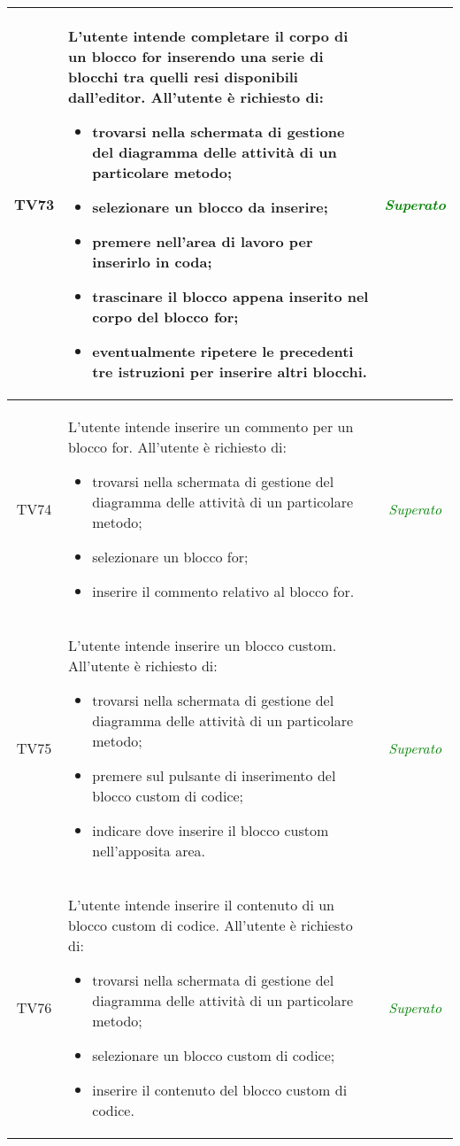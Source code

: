 \begin{longtable}{|c|>{}m{8cm}|c|}
\hypertarget{TV4.5.4}{TV73} & L'utente intende completare il corpo di un blocco for inserendo una serie di blocchi tra quelli resi disponibili dall'editor.
All'utente è richiesto di:
\begin{itemize}
	\item trovarsi nella schermata di gestione del diagramma delle attività di un particolare metodo;
	\item selezionare un blocco da inserire;
	\item premere nell'area di lavoro per inserirlo in coda;
	\item trascinare il blocco appena inserito nel corpo del blocco for;
	\item eventualmente ripetere le precedenti tre istruzioni per inserire altri blocchi.
\end{itemize} & \textcolor{Green}{\textit{Superato}}\\ \hline

\hypertarget{TV4.5.5}{TV74} & L'utente intende inserire un commento per un blocco for.
All'utente è richiesto di:
\begin{itemize}
	\item trovarsi nella schermata di gestione del diagramma delle attività di un particolare metodo;
	\item selezionare un blocco for;
	\item inserire il commento relativo al blocco for.
\end{itemize} & \textcolor{Green}{\textit{Superato}}\\ \hline

\hypertarget{TV4.6}{TV75} & L'utente intende inserire un blocco custom.
All'utente è richiesto di:
\begin{itemize}
	\item trovarsi nella schermata di gestione del diagramma delle attività di un particolare metodo;
	\item premere sul pulsante di inserimento del blocco custom di codice;
	\item indicare dove inserire il blocco custom nell'apposita area.
\end{itemize} & \textcolor{Green}{\textit{Superato}}\\ \hline

\hypertarget{TV4.6.1}{TV76} & L'utente intende inserire il contenuto di un blocco custom di codice.
All'utente è richiesto di:
\begin{itemize}
	\item trovarsi nella schermata di gestione del diagramma delle attività di un particolare metodo;
	\item selezionare un blocco custom di codice;
	\item inserire il contenuto del blocco custom di codice.
\end{itemize} & \textcolor{Green}{\textit{Superato}}\\ \hline


\end{longtable}
